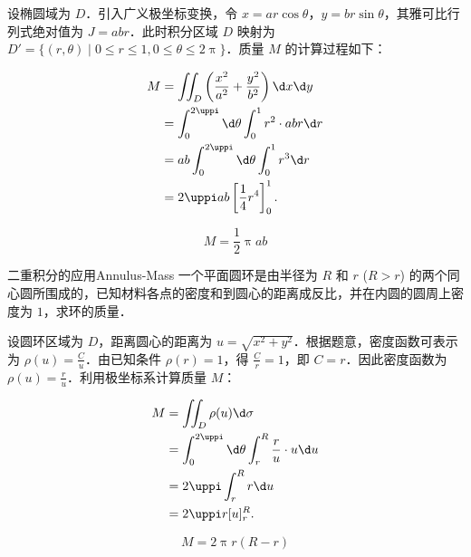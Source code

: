 \begin{solution}
    设椭圆域为 $D$．引入广义极坐标变换，令 $x = ar \cos \theta$，$y = br \sin \theta$，其雅可比行列式绝对值为 $J = abr$．此时积分区域 $D$ 映射为 $D' = \{(r, \theta) \mid 0 \le r \le 1, 0 \le \theta \le 2\uppi\}$．质量 $M$ 的计算过程如下：

    \begin{equation}
        \begin{aligned}
            M & = \iint_{D} \left( \frac{x^2}{a^2} + \frac{y^2}{b^2} \right) \d x \d y \\
              & = \int_{0}^{2\uppi} \d \theta \int_{0}^{1} r^2 \cdot abr \d r          \\
              & = ab \int_{0}^{2\uppi} \d \theta \int_{0}^{1} r^3 \d r                 \\
              & = 2\uppi ab \left[ \frac{1}{4} r^4 \right]_{0}^{1} .
        \end{aligned}
    \end{equation}

    \begin{equation}
        M = \boxed{\frac{1}{2} \uppi ab}
    \end{equation}
\end{solution}

\begin{problem}{二重积分的应用}{Annulus-Mass}
    一个平面圆环是由半径为 $R$ 和 $r$ ($R > r$) 的两个同心圆所围成的，已知材料各点的密度和到圆心的距离成反比，并在内圆的圆周上密度为 $1$，求环的质量．
\end{problem}

\begin{solution}
    设圆环区域为 $D$，距离圆心的距离为 $u = \sqrt{x^2 + y^2}$．根据题意，密度函数可表示为 $\rho(u) = \frac{C}{u}$．由已知条件 $\rho(r) = 1$，得 $\frac{C}{r} = 1$，即 $C = r$．因此密度函数为 $\rho(u) = \frac{r}{u}$．利用极坐标系计算质量 $M$：

    \begin{equation}
        \begin{aligned}
            M & = \iint_{D} \rho(u) \d \sigma                                       \\
              & = \int_{0}^{2\uppi} \d \theta \int_{r}^{R} \frac{r}{u} \cdot u \d u \\
              & = 2\uppi \int_{r}^{R} r \d u                                        \\
              & = 2\uppi r [u]_{r}^{R} .
        \end{aligned}
    \end{equation}

    \begin{equation}
        M = \boxed{2\uppi r (R - r)}
    \end{equation}
\end{solution}

